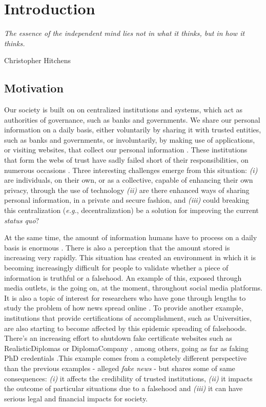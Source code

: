 \chapter{Introduction}
\label{chap:intro}

\epigraph{\textit{The essence of the independent mind lies not in what it thinks, but in how it thinks.}}{Christopher Hitchens}

\section{Motivation}
\label{sec:intro-motivation}

Our society is built on on centralized institutions and systems, which act as authorities of governance, such as banks and governments. We share our personal information on a daily basis, either voluntarily by sharing it with trusted entities, such as banks and governments, or involuntarily, by making use of applications, or visiting websites, that collect our personal information \cite{debatin_facebook_2009, choi_embarrassing_2015, shilton_four_nodate}. These institutions that form the webs of trust have sadly failed short of their responsibilities, on numerous occasions \cite{gibbs_facebook_2014, ivashina_bank_2010, marthews_government_2017}. Three interesting challenges emerge from this situation: \emph{(i)} are individuals, on their own, or as a collective, capable of enhancing their own privacy, through the use of technology \emph{(ii)} are there enhanced ways of sharing personal information, in a private and secure fashion, and \emph{(iii)} could breaking this centralization (\textit{e.g.}, decentralization) be a solution for improving the current \textit{status quo}?

At the same time, the amount of information humans have to process on a daily basis is enormous \cite{hilbert_worlds_2011, lee_information_2016}. There is also a perception that the amount stored is increasing very rapidly. This situation has created an environment in which it is becoming increasingly difficult for people to validate whether a piece of information is truthful or a falsehood. An example of this, exposed through media outlets, is the  going on, at the moment, throughout social media platforms. It is also a topic of interest for researchers who have gone through lengths to study the problem of how news spread online \cite{vosoughi_spread_2018}. To provide another example, institutions that provide certifications of accomplishment, such as Universities, are also starting to become affected by this epidemic spreading of falsehoods. There’s an increasing effort to shutdown fake certificate websites \cite{camilla_telegraph} such as RealisticDiplomas \cite{RealisticDiplomas} or DiplomaCompany \cite{DiplomaCompany}, among others, going as far as faking PhD credentials \cite{doctoroff_tang_2010}.This example comes from a completely different perspective than the previous examples - alleged \textit{fake news} - but shares some of same consequences: \emph{(i)} it affects the credibility of trusted institutions, \emph{(ii)} it impacts the outcome of particular situations due to a falsehood and \emph{(iii)} it can have serious legal and financial impacts for society.

